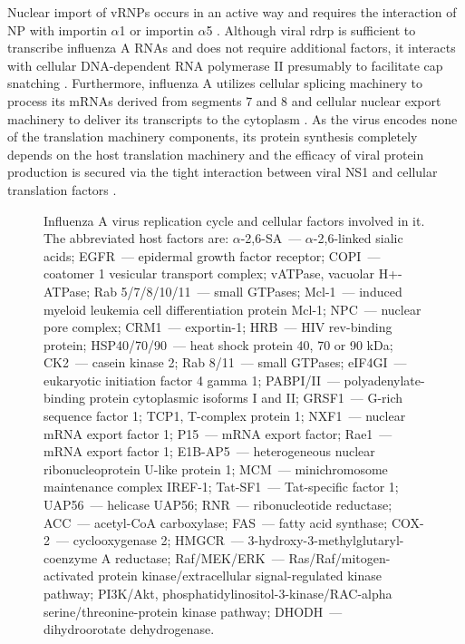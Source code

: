 	Nuclear import of \gls{vRNP}s occurs in an active way and requires the interaction of \gls{NP} with importin $\alpha$1 or importin $\alpha$5 \parencite{Cros2005}. Although viral \gls{rdrp} is sufficient to transcribe influenza A RNAs and does not require additional factors, it interacts with cellular DNA-dependent RNA polymerase II presumably to facilitate cap snatching \parencite{Engelhardt2005}. Furthermore, influenza A utilizes cellular splicing machinery to process its mRNAs derived from segments 7 and 8 \parencite{Dubois2014} and cellular nuclear export machinery to deliver its transcripts to the cytoplasm \parencite{York2013}. As the virus encodes none of the translation machinery components, its protein synthesis completely depends on the host translation machinery and the efficacy of viral protein production is secured via the tight interaction between viral \gls{NS1} and cellular translation factors \parencite{DelaLuna1995, Burgui2003, Aragon2000}.
	
	\begin{figure}[h!]
				\centering
				\caption{Influenza A virus replication cycle and cellular factors involved in it. The abbreviated host factors are: $\alpha$-2,6-SA~--- $\alpha$-2,6-linked sialic acids; EGFR~--- epidermal growth factor receptor; COPI~--- coatomer 1 vesicular transport complex; vATPase, vacuolar H+-ATPase; Rab 5/7/8/10/11~--- small GTPases; Mcl-1~--- induced myeloid leukemia cell differentiation protein Mcl-1; NPC~--- nuclear pore complex; CRM1~--- exportin-1; HRB~--- HIV rev-binding protein; HSP40/70/90~--- heat shock protein 40, 70 or 90 kDa; CK2~--- casein kinase 2; Rab 8/11~--- small GTPases; eIF4GI~--- eukaryotic initiation factor 4 gamma 1; PABPI/II~--- polyadenylate-binding protein cytoplasmic isoforms I and II; GRSF1~--- G-rich sequence factor 1; TCP1, T-complex protein 1;  NXF1~--- nuclear mRNA export factor 1; P15~--- mRNA export factor; Rae1~--- mRNA export factor 1; E1B-AP5~--- heterogeneous nuclear ribonucleoprotein U-like protein 1; MCM~--- minichromosome maintenance complex IREF-1; Tat-SF1~--- Tat-specific factor 1; UAP56~--- helicase UAP56; RNR~--- ribonucleotide reductase; ACC~--- acetyl-CoA carboxylase; FAS~--- fatty acid synthase; COX-2~--- cyclooxygenase 2; HMGCR~--- 3-hydroxy-3-methylglutaryl-coenzyme A reductase; Raf/MEK/ERK~--- Ras/Raf/mitogen-activated protein kinase/extracellular signal-regulated kinase pathway; PI3K/Akt, phosphatidylinositol-3-kinase/RAC-alpha serine/threonine-protein kinase pathway; DHODH~--- dihydroorotate dehydrogenase.} \label{fig:cycle}
			\end{figure}	
	

